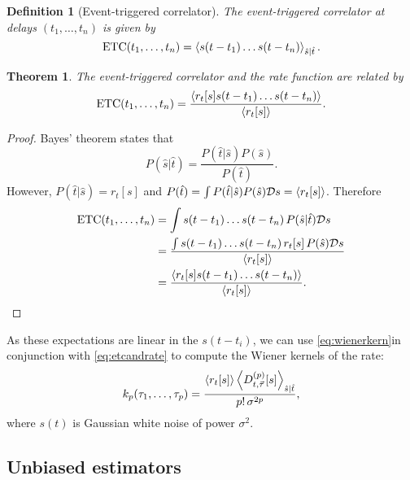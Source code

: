 \documentclass[12pt]{article}
\theoremstyle{slplain}
\newtheorem{thm}{Theorem}
\theoremstyle{sldefinition}
\newtheorem{defn}{Definition}
\theoremstyle{remark}
\DeclareMathOperator{\ETC}{ETC}
\begin{document}
\begin{defn}[Event-triggered correlator]
  The event-triggered correlator at delays $(t_1,\ldots,t_n)$ is given by
  \begin{equation}\label{eq:evtrigcorr}
    \ETC(t_1,\ldots,t_n) = \av{s(t-t_1)\ldots s(t-t_n)}_{\hat{s}|\hat{t}}.
  \end{equation}
\end{defn}

\begin{thm}
  The event-triggered correlator and the rate function are related by
  \begin{equation}\label{eq:etcandrate}
    \ETC(t_1,\ldots,t_n) = \frac{\av{r_t[s]s(t-t_1)\ldots s(t-t_n)}}{\av{r_t[s]}}.
  \end{equation}
\end{thm}
\begin{proof}
  Bayes' theorem states that
  \begin{equation}\label{eq:bayes}
    P(\hat{s}|\hat{t}) = \frac{P(\hat{t}|\hat{s})P(\hat{s})}{P(\hat{t})}.
  \end{equation}
  However, $P(\hat{t}|\hat{s})=r_t[s]$ and $P(\hat{t})=\int P(\hat{t}|\hat{s})P(\hat{s})\mathcal{D} s = \left\langle r_t[s] \right\rangle$. Therefore
  \begin{equation}\label{eq:pfetcandrate}
    \begin{aligned}
      \ETC(t_1,\ldots,t_n) &= \int s(t-t_1)\ldots s(t-t_n) \, P(\hat{s}|\hat{t})\CD s\\
        &= \frac{\int s(t-t_1)\ldots s(t-t_n) \, r_t[s]\,P(\hat{s})\CD s }{ \av{r_t[s]} }\\
        &= \frac{\av{r_t[s]s(t-t_1)\ldots s(t-t_n)}}{\av{r_t[s]}}.
    \end{aligned}
  \end{equation}
\end{proof}

As these expectations are linear in the $s(t-t_i)$, we can use \eqref{eq:wienerkern}in conjunction with \eqref{eq:etcandrate} to compute the Wiener kernels of the rate:
%
\begin{equation}\label{eq:ratewiener}
  k_p(\tau_1,\ldots,\tau_p) = \frac{ \left\langle r_t[s] \right\rangle \left\langle D^{(p)}_{t,\vec{\tau}}[s] \right\rangle_{\hat{s}|\hat{t}} }{ p! \, \sigma^{2p} },
\end{equation}
%
where $s(t)$ is Gaussian white noise of power $\sigma^2$.

\subsection{Unbiased estimators}\label{sec:poissonest}
\end{document}
